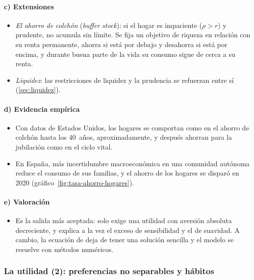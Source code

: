 \documentclass[11pt]{article}
\begin{document}
\paragraph{c) Extensiones}

\begin{itemize}
\item \emph{El ahorro de colchón} (\emph{buffer stock}): si el hogar es impaciente ($\rho>r$) y prudente, no acumula sin límite. Se fija un objetivo de riqueza en relación con su renta permanente, ahorra si está por debajo y desahorra si está por encima, y durante buena parte de la vida su consumo sigue de cerca a su renta\nocite{Carroll1997Buffer}.
\item \emph{Liquidez}: las restricciones de liquidez y la prudencia se refuerzan entre sí (\ref{sec:liquidez}).
\end{itemize}

\paragraph{d) Evidencia empírica}

\begin{itemize}
\item Con datos de Estados Unidos, los hogares se comportan como en el ahorro de colchón hasta los 40~años, aproximadamente, y después ahorran para la jubilación como en el ciclo vital\nocite{GourinchasParker2002}.
\item En España, más incertidumbre macroeconómica en una comunidad autónoma reduce el consumo de sus familias\nocite{NunezCarrasco2013Consumo}, y el ahorro de los hogares se disparó en 2020 (gráfico~\ref{fig:tasa-ahorro-hogares}).
\end{itemize}

\paragraph{e) Valoración}

\begin{itemize}
\item Es la salida más aceptada: solo exige una utilidad con aversión absoluta decreciente, y explica a la vez el exceso de sensibilidad y el de suavidad. A cambio, la ecuación de  deja de tener una solución sencilla y el modelo se resuelve con métodos numéricos.
\end{itemize}

\subsubsection{La utilidad (2): preferencias no separables y hábitos}\label{sec:habitos}
\end{document}
